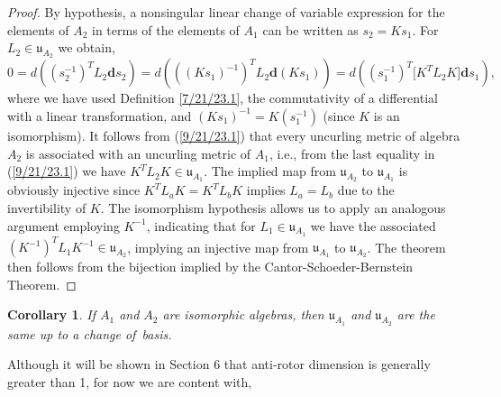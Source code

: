 \documentclass{amsart}
\newtheorem{corollary}[theorem]{Corollary}
\theoremstyle{definition}
\numberwithin{theorem}{section}
\numberwithin{equation}{section}
\begin{document}
\begin{proof} By hypothesis, a nonsingular linear change of variable expression for the elements of $A_2$ in terms of the elements of $A_1$ can be written as $s_2= Ks_1$. \mbox{For $L_2\in \mathfrak{u}_{A_2}$} we obtain, \begin{equation} 0 = d\left((s_2^{-1})^T L_2 \mathbf{d}s_2\right) =  d\left(((Ks_1)^{-1})^T L_2 \mathbf{d}(Ks_1)\right) = d\left((s_1^{-1})^T \big[K^T L_2K\big]\mathbf{d}s_1\right), \label{9/21/23.1}  \end{equation} where we have used Definition \ref{7/21/23.1}, the commutativity of a differential with a linear transformation, and $(Ks_1)^{-1} = K(s_1^{-1})$ (since $K$ is an isomorphism).   It follows from (\ref{9/21/23.1}) that every uncurling metric  of algebra $A_2$ is associated with an uncurling metric of $A_1$, i.e., from the last equality in (\ref{9/21/23.1}) we have  $K^TL_2K\in\mathfrak{u}_{A_1}$. The implied map from $\mathfrak{u}_{A_2}$ to $\mathfrak{u}_{A_1}$ is obviously injective since $K^TL_aK=K^TL_bK$ implies $L_a=L_b$ due to the invertibility of $K$.   The isomorphism hypothesis allows us to apply an analogous argument employing $K^{-1}$, indicating that for $L_1\in\mathfrak{u}_{A_1}$ we have the associated $(K^{-1})^T L_1 K^{-1} \in \mathfrak{u}_{A_2}$, implying an injective map from $\mathfrak{u}_{A_1}$ to $\mathfrak{u}_{A_2}$.  The theorem then follows from the bijection implied by the Cantor-Schoeder-Bernstein Theorem. 
\end{proof}

\begin{corollary}\label{7/31/25.1} If $A_1$ and $A_2$ are isomorphic algebras, then $\mathfrak{u}_{A_1}$ and $\mathfrak{u}_{A_2}$ are the same up to a change \mbox{of basis}. \end{corollary}  

Although it will be shown in Section 6 that anti-rotor dimension is generally greater than 1, for now we are content with,       
\end{document}
